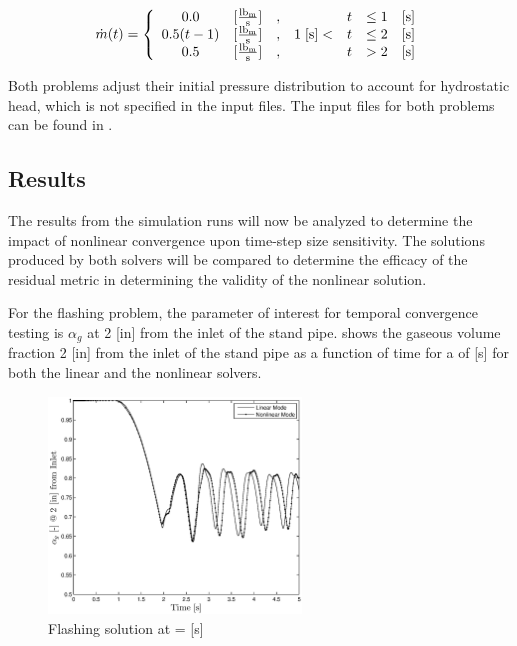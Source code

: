 \begin{equation}
\label{eqn:bc_time_func_single}
\dot{m}(t) = \left\{
\begin{array}{cclrcll}
 0.0           & [\frac{ \lbm{} }{\text{s}}] & , &                & t & \leq 1 & [\text{s}] \\
 0.5 ( t - 1)  & [\frac{ \lbm{} }{\text{s}}] & , & 1\; [\text{s}] < & t & \leq 2 & [\text{s}] \\
 0.5           & [\frac{ \lbm{} }{\text{s}}] & , &                & t & > 2    & [\text{s}]
\end{array}\right.
\end{equation}

Both problems adjust their initial pressure distribution to account for hydrostatic head, which is not specified in the input files.
The \cobra{} input files for both problems can be found in .

\subsection{Results}
\label{subsect:single_results}

The results from the simulation runs will now be analyzed to determine the impact of nonlinear convergence upon time-step size sensitivity.
The solutions produced by both solvers will be compared to determine the efficacy of the residual metric in determining the validity of the nonlinear solution.  

For the flashing problem, the parameter of interest for temporal convergence testing is $\alpha_g$ at 2 [in] from the inlet of the stand pipe.
 shows the gaseous volume fraction 2 [in] from the inlet of the stand pipe as a function of time for a \dtmax{} of  [s] for both the linear and the nonlinear solvers.

\begin{figure}[h!tb]
\centering
\includegraphics[width=0.6\textwidth]{plots/flashing_1em1.eps}
\caption{Flashing solution at \dtmax{} =  {[s]}}
\label{fig:flashing_1em1}
\end{figure}

